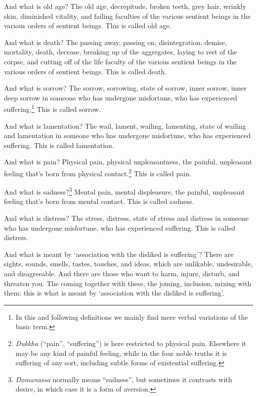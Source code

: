 \documentclass[12pt,openany]{book}%
\begin{document}
And what is old age? The old age, decrepitude, broken teeth, grey hair, wrinkly skin, diminished vitality, and failing faculties of the various sentient beings in the various orders of sentient beings. This is called old age. 

And what is death? The passing away, passing on, disintegration, demise, mortality, death, decease, breaking up of the aggregates, laying to rest of the corpse, and cutting off of the life faculty of the various sentient beings in the various orders of sentient beings. This is called death. 

And what is sorrow? The sorrow, sorrowing, state of sorrow, inner sorrow, inner deep sorrow in someone who has undergone misfortune, who has experienced suffering.\footnote{In this and following definitions we mainly find mere verbal variations of the basic term. } This is called sorrow. 

And what is lamentation? The wail, lament, wailing, lamenting, state of wailing and lamentation in someone who has undergone misfortune, who has experienced suffering. This is called lamentation. 

And what is pain? Physical pain, physical unpleasantness, the painful, unpleasant feeling that’s born from physical contact.\footnote{\textit{Dukkha} (“pain”, “suffering”) is here restricted to physical pain. Elsewhere it may be any kind of painful feeling, while in the four noble truths it is suffering of any sort, including subtle forms of existential suffering. } This is called pain. 

And what is sadness?\footnote{\textit{Domanassa} normally means “sadness”, but sometimes it contrasts with desire, in which case it is a form of aversion. } Mental pain, mental displeasure, the painful, unpleasant feeling that’s born from mental contact. This is called sadness. 

And what is distress? The stress, distress, state of stress and distress in someone who has undergone misfortune, who has experienced suffering. This is called distress. 

And what is meant by ‘association with the disliked is suffering’? There are sights, sounds, smells, tastes, touches, and ideas, which are unlikable, undesirable, and disagreeable. And there are those who want to harm, injure, disturb, and threaten you. The coming together with these, the joining, inclusion, mixing with them: this is what is meant by ‘association with the disliked is suffering’. 
\end{document}
